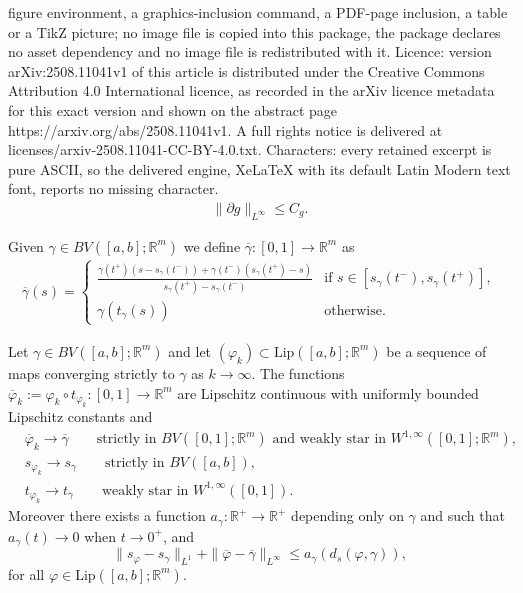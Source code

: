 \documentclass[10pt,a4paper]{amsart}
\newcommand{\R}{\mathbb{R}}
\begin{document}
figure environment, a graphics-inclusion command, a PDF-page inclusion, a table or a TikZ picture; no image file is copied into this package, the package declares no asset dependency and no image file is redistributed with it. Licence: version arXiv:2508.11041v1 of this article is distributed under the Creative Commons Attribution 4.0 International licence, as recorded in the arXiv licence metadata for this exact version and shown on the abstract page https://arxiv.org/abs/2508.11041v1. A full rights notice is delivered at licenses/arxiv-2508.11041-CC-BY-4.0.txt. Characters: every retained excerpt is pure ASCII, so the delivered engine, XeLaTeX with its default Latin Modern text font, reports no missing character.
\begin{align}\label{growthbis}
\|\partial g\|_{L^\infty}\leq C_g.
\end{align}

\begin{definition}
Given $\gamma\in BV([a,b];\R^m)$ we define $\overline \gamma:[0,1]\rightarrow \R^m$ as  
\begin{align}\label{gencurve}
	\overline \gamma(s)=\begin{cases}
		\frac{\gamma(t^+)(s-s_\gamma(t^-))+\gamma(t^-)(s_\gamma(t^+)-s)}{s_\gamma(t^+)-s_\gamma(t^-)}&\text{if }s\in [s_\gamma(t^-),s_\gamma(t^+)],\\
		\gamma(t_\gamma(s))&\text{otherwise.}
	\end{cases}
\end{align}
\end{definition}

\begin{prop}\label{prop_convstrict}
Let $\gamma\in BV([a,b];\R^m)$ and let $(\varphi_k)\subset \textrm{Lip}([a,b];\R^m)$ be a sequence of maps converging strictly to $\gamma$ as $k\rightarrow \infty$. The functions $\overline \varphi_k:=\varphi_k\circ t_{\varphi_k}:[0,1]\rightarrow \R^m$ are Lipschitz continuous with uniformly bounded Lipschitz constants and \begin{align}\label{conv_curves}
&\overline\varphi_k\rightarrow \overline \gamma\qquad \text{strictly in $BV([0,1];\R^m)$ and weakly star in }W^{1,\infty}([0,1];\R^m),\nonumber\\
&s_{\varphi_k}\rightarrow s_\gamma\qquad \text{strictly in }BV([a,b]),\\
&t_{\varphi_k}\rightarrow t_\gamma\qquad \text{weakly star in }W^{1,\infty}([0,1]).\nonumber
\end{align}  
Moreover there exists a function $a_\gamma:\R^+\rightarrow \R^+$ depending only on $\gamma$ and such that $a_\gamma(t)\rightarrow 0$ when $t\rightarrow0^+$, and 
$$\|s_{\varphi}-s_\gamma\|_{L^1}+\|\overline\varphi-\overline \gamma\|_{L^\infty}\leq a_\gamma(d_s(\varphi,\gamma)),$$
for all $\varphi\in \textrm{Lip}([a,b];\R^m)$. 
\end{prop}
\end{document}
